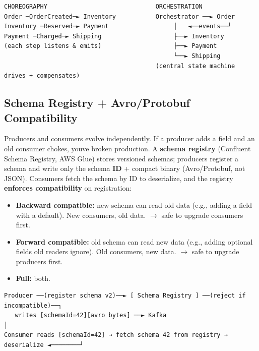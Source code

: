 \documentclass[11pt]{article}
\providecommand{\tightlist}{\setlength{\itemsep}{1pt}\setlength{\parskip}{0pt}}
\begin{document}
\setcodelang{}

\begin{verbatim}
CHOREOGRAPHY                              ORCHESTRATION
Order ─OrderCreated─► Inventory           Orchestrator ──► Order
Inventory ─Reserved─► Payment                  │   ◄──events──┘
Payment ─Charged─► Shipping                    ├──► Inventory
(each step listens & emits)                    ├──► Payment
                                               └──► Shipping
                                          (central state machine drives + compensates)
\end{verbatim}

\subsection{Schema Registry + Avro/Protobuf Compatibility}\label{schema-registry--avroprotobuf-compatibility}

Producers and consumers evolve independently. If a producer adds a field and an old consumer chokes, you\textquotesingle ve broken production. A \textbf{schema registry} (Confluent Schema Registry, AWS Glue) stores versioned schemas; producers register a schema and write only the schema \textbf{ID} + compact binary (Avro/Protobuf, not JSON). Consumers fetch the schema by ID to deserialize, and the registry \textbf{enforces compatibility} on registration:

\begin{itemize}
\tightlist
\item
  \textbf{Backward compatible:} new schema can read old data (e.g., adding a field with a default). New consumers, old data. \(\rightarrow\) safe to upgrade consumers first.
\item
  \textbf{Forward compatible:} old schema can read new data (e.g., adding optional fields old readers ignore). Old consumers, new data. \(\rightarrow\) safe to upgrade producers first.
\item
  \textbf{Full:} both.
\end{itemize}

\setcodelang{}

\begin{verbatim}
Producer ──(register schema v2)──► [ Schema Registry ] ──(reject if incompatible)──┐
   writes [schemaId=42][avro bytes] ──► Kafka                                       │
Consumer reads [schemaId=42] → fetch schema 42 from registry → deserialize ◄────────┘
\end{verbatim}
\end{document}
